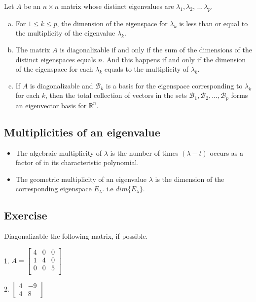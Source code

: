 \documentclass[aima104_lecturenotes_ku.tex]{subfiles}
\begin{document}
\begin{theorem}
  Let $A$ be an $n \times n$ matrix whose distinct eigenvalues are $\lambda_1, \lambda_2,\, ...\, \lambda_p$.
  \begin{enumerate}[a. ]
  \item For $1 \leq k \leq p$, the dimension of the eigenspace for $\lambda_k$ is less than or equal to the multiplicity of the eigenvalue $\lambda_k$.
  \item The matrix $A$ is diagonalizable if and only if the sum of the dimensions of the distinct eigenspaces equals $n$. And this happens if and only if the dimension of the eigenspace for each $\lambda_k$ equals to the multiplicity of $\lambda_k$.
   \item If $A$ is diagonalizable and $\mathcal{B}_k$ is a basis for the eigenspace corresponding to $\lambda_k$ for each $k$, then the total collection of vectors in the sets $\mathcal{B}_1, \mathcal{B}_2, ..., \mathcal{B}_p$ forms an eigenvector basis for $\mathbb{R}^n$.
  \end{enumerate}
\end{theorem}

\subsection{Multiplicities of an eigenvalue}
\begin{itemize}
\item The algebraic multiplicity of $\lambda$ is the number of times $(\lambda - t)$ occurs as a factor of in its characteristic polynomial.
\item The geometric multiplicity of an eigenvalue $\lambda$ is the dimension of the corresponding eigenspace $E_{\lambda}$. i.e $dim\{E_{\lambda}\}$.
\end{itemize}
\subsection{Exercise}
Diagonalizable the following matrix, if possible.
\begin{multicols}{2}
1. $A=
\begin{bmatrix}
  4 & 0 & 0  \\
  1 & 4 & 0  \\
   0& 0 & 5  \\
\end{bmatrix}
$
\columnbreak

2. $
\begin{bmatrix}
  4 & -9 \\
  4 & 8
\end{bmatrix}
$

\end{multicols}
\end{document}
